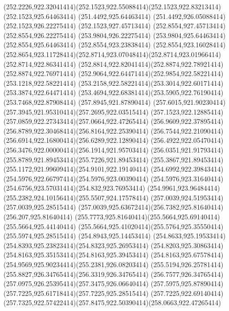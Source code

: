 {{	\curveto(252.2226,922.32041414)(252.1523,922.55088414)(252.1523,922.83213414)
	\lineto(252.1523,925.64463414)
	\lineto(251.4492,925.64463414)
	\lineto(251.4492,926.05088414)
	\lineto(252.1523,926.22275414)
	\lineto(252.1523,927.45713414)
	\lineto(252.8554,927.45713414)
	\lineto(252.8554,926.22275414)
	\lineto(253.9804,926.22275414)
	\lineto(253.9804,925.64463414)
	\lineto(252.8554,925.64463414)
	\lineto(252.8554,923.23838414)
	\lineto(252.8554,923.16028414)
	\curveto(252.8654,923.11728414)(252.8714,923.07048414)(252.8714,923.01966414)
	\lineto(252.8714,922.86341414)
	\curveto(252.8814,922.82041414)(252.8874,922.78921414)(252.8874,922.76971414)
	\curveto(252.9064,922.64471414)(252.9854,922.58221414)(253.1218,922.58221414)
	\curveto(253.2158,922.58221414)(253.3014,922.60171414)(253.3874,922.64471414)
	\curveto(253.4694,922.68381414)(253.5905,922.76190414)(253.7468,922.87908414)
	\closepath
	\moveto(257.8945,921.87890414)
	\curveto(257.6015,921.90230414)(257.3945,921.95310414)(257.2695,922.03515414)
	\curveto(257.1523,922.12885414)(257.0859,922.27343414)(257.0664,922.47265414)
	\curveto(256.9609,922.37895414)(256.8789,922.30468414)(256.8164,922.25390414)
	\curveto(256.7544,922.21090414)(256.6914,922.16800414)(256.6289,922.12890414)
	\curveto(256.4922,922.05470414)(256.3476,922.00000414)(256.1914,921.95703414)
	\curveto(256.0351,921.91793414)(255.8789,921.89453414)(255.7226,921.89453414)
	\curveto(255.3867,921.89453414)(255.1172,921.99609414)(254.9101,922.19140414)
	\curveto(254.6992,922.39843414)(254.5976,922.66797414)(254.5976,923.00390414)
	\curveto(254.5976,923.31640414)(254.6756,923.57031414)(254.832,923.76953414)
	\curveto(254.9961,923.96484414)(255.2382,924.10156414)(255.5507,924.17578414)
	\lineto(257.0039,924.51953414)
	\lineto(257.0039,925.28515414)
	\curveto(257.0039,925.63672414)(256.7382,925.81640414)(256.207,925.81640414)
	\curveto(255.7773,925.81640414)(255.5664,925.69140414)(255.5664,925.44140414)
	\curveto(255.5664,925.41020414)(255.5764,925.35550414)(255.5974,925.28515414)
	\lineto(254.8943,925.14453414)
	\curveto(254.8633,925.19533414)(254.8393,925.23823414)(254.8323,925.26953414)
	\curveto(254.8203,925.30863414)(254.8163,925.35153414)(254.8163,925.39453414)
	\curveto(254.8163,925.67578414)(254.9569,925.90234414)(255.2381,926.08203414)
	\curveto(255.5194,926.25781414)(255.8827,926.34765414)(256.3319,926.34765414)
	\curveto(256.7577,926.34765414)(257.0975,926.25395414)(257.3475,926.06640414)
	\curveto(257.5975,925.87890414)(257.7225,925.61718414)(257.7225,925.28515414)
	\lineto(257.7225,922.69140414)
	\curveto(257.7325,922.57422414)(257.8475,922.50390414)(258.0663,922.47265414)
}}
